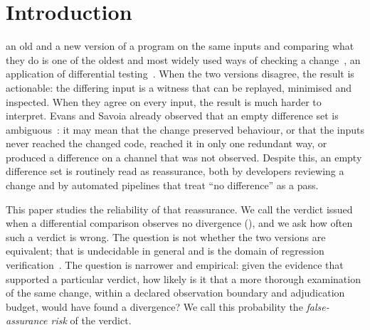 \section{Introduction}\label{sec:intro}

 an old and a new version of a program on the same inputs and comparing what they do is one of the oldest and most widely used ways of checking a change~\cite{evans2007differential}, an application of differential testing~\cite{mckeeman1998differential}. When the two versions disagree, the result is actionable: the differing input is a witness that can be replayed, minimised and inspected. When they agree on every input, the result is much harder to interpret. Evans and Savoia already observed that an empty difference set is ambiguous~\cite{evans2007differential}: it may mean that the change preserved behaviour, or that the inputs never reached the changed code, reached it in only one redundant way, or produced a difference on a channel that was not observed. Despite this, an empty difference set is routinely read as reassurance, both by developers reviewing a change and by automated pipelines that treat ``no difference'' as a pass.

This paper studies the reliability of that reassurance. We call the verdict issued when a differential comparison observes no divergence \NDOfull{} (\NDO{}), and we ask how often such a verdict is wrong. The question is not whether the two versions are equivalent; that is undecidable in general and is the domain of regression verification~\cite{godlin2009regression,lahiri2012symdiff}. The question is narrower and empirical: given the evidence that supported a particular \NDO{} verdict, how likely is it that a more thorough examination of the same change, within a declared observation boundary and adjudication budget, would have found a divergence? We call this probability the \emph{false-assurance risk} of the verdict.

